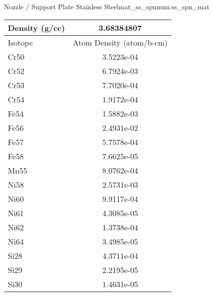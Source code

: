 \begin{matitem}{Nozzle / Support Plate Stainless Steel}{mat_ss_spn}{num:ss_spn_mat}
  \centering
  \begin{tabular}{l c}
    \toprule
    Density (g/cc) & 3.68384807 \\
    \midrule
    Isotope & Atom Density (atom/b-cm) \\
    \midrule
    \midrule
Cr50 & 3.5223e-04 \\
Cr52 & 6.7924e-03 \\
Cr53 & 7.7020e-04 \\
Cr54 & 1.9172e-04 \\
Fe54 & 1.5882e-03 \\
Fe56 & 2.4931e-02 \\
Fe57 & 5.7578e-04 \\
Fe58 & 7.6625e-05 \\
Mn55 & 8.0762e-04 \\
Ni58 & 2.5731e-03 \\
Ni60 & 9.9117e-04 \\
Ni61 & 4.3085e-05 \\
Ni62 & 1.3738e-04 \\
Ni64 & 3.4985e-05 \\
Si28 & 4.3711e-04 \\
Si29 & 2.2195e-05 \\
Si30 & 1.4631e-05 \\

    \bottomrule
  \end{tabular}
\end{matitem}

